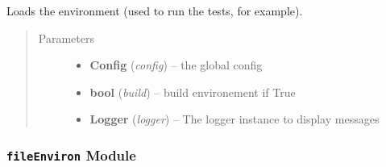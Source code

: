 \documentclass[a4paper,10pt,english]{sphinxmanual}
\begin{document}
\begin{fulllineitems}
\label{commands/apidoc/src:src.environment.load_environment}
Loads the environment (used to run the tests, for example).
\begin{quote}\begin{description}
\item[{Parameters}] \leavevmode\begin{itemize}
\item {} 
\textbf{Config} (\emph{config}) -- the global config

\item {} 
\textbf{bool} (\emph{build}) -- build environement if True

\item {} 
\textbf{Logger} (\emph{logger}) -- The logger instance to display messages

\end{itemize}

\end{description}\end{quote}

\end{fulllineitems}



\subsubsection{\texttt{fileEnviron} Module}
\label{commands/apidoc/src:fileenviron-module}\label{commands/apidoc/src:module-src.fileEnviron}
\end{document}
